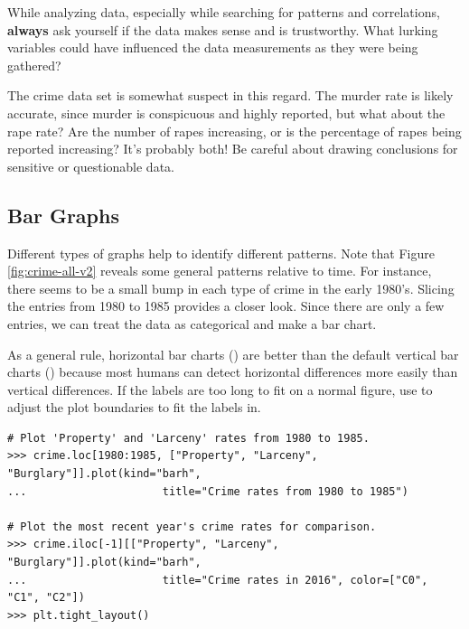 \begin{warn}
While analyzing data, especially while searching for patterns and correlations, \textbf{always} ask yourself if the data makes sense and is trustworthy.
What lurking variables could have influenced the data measurements as they were being gathered?

The crime data set is somewhat suspect in this regard.
The murder rate is likely accurate, since murder is conspicuous and highly reported, but what about the rape rate?
Are the number of rapes increasing, or is the percentage of rapes being reported increasing? 
It's probably both!
Be careful about drawing conclusions for sensitive or questionable data.
\end{warn}

\subsection*{Bar Graphs}

Different types of graphs help to identify different patterns.
Note that Figure \ref{fig:crime-all-v2} reveals some general patterns relative to time.
For instance, there seems to be a small bump in each type of crime in the early 1980's.
Slicing the entries from 1980 to 1985 provides a closer look.
Since there are only a few entries, we can treat the data as categorical and make a bar chart.

As a general rule, horizontal bar charts () are better than the default vertical bar charts () because most humans can detect horizontal differences more easily than vertical differences.
If the labels are too long to fit on a normal figure, use  to adjust the plot boundaries to fit the labels in.

\begin{lstlisting}
# Plot 'Property' and 'Larceny' rates from 1980 to 1985.
>>> crime.loc[1980:1985, ["Property", "Larceny", "Burglary"]].plot(kind="barh",
...                     title="Crime rates from 1980 to 1985")

# Plot the most recent year's crime rates for comparison.
>>> crime.iloc[-1][["Property", "Larceny", "Burglary"]].plot(kind="barh",
...                     title="Crime rates in 2016", color=["C0", "C1", "C2"])
>>> plt.tight_layout()
\end{lstlisting}

